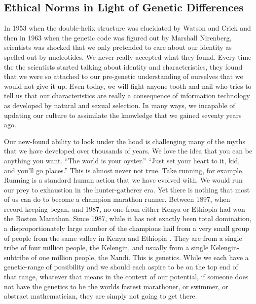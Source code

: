 \subsection{Ethical Norms in Light of Genetic Differences}

In 1953 when the double-helix structure was elucidated by Watson and Crick and then in 1963 when the genetic code was figured out by Marshall Nirenberg, scientists was shocked that we only pretended to care about our identity as spelled out by nucleotides.
We never really accepted what they found.
Every time the the scientists started talking about identity and characteristics, they found that we were so attached to our pre-genetic understanding of ourselves that we would not give it up.
Even today, we will fight anyone tooth and nail who tries to tell us that our characteristics are really a consequence of information technology as developed by natural and sexual selection.
In many ways, we incapable of updating our culture to assimilate the knowledge that we gained seventy years ago.

Our new-found ability to look under the hood is challenging many of the myths that we have developed over thousands of years.
We love the idea that you can be anything you want.
``The world is your oyster.''
``Just set your heart to it, kid, and you'll go places.''
This is almost never not true.
Take running, for example.
Running is a standard human action that we have evolved with.
We would run our prey to exhaustion in the hunter-gatherer era.
Yet there is nothing that most of us can do to become a champion marathon runner.
Between 1897, when record-keeping began, and 1987, no one from either Kenya or Ethiopia had won the Boston Marathon.
Since 1987, while it has not exactly been total domination, a disproportionately large number of the champions hail from a very small group of people from the same valley in Kenya and Ethiopia \cite{marathon2020}.
They are from a single tribe of four million people, the Kelengin, and usually from a single Kelengin-subtribe of one million people, the Nandi.
This is genetics.
While we each have a genetic-range of possibility and we should each aspire to be on the top end of that range, whatever that means in the context of our potential, if someone does not have the genetics to be the worlds fastest marathoner, or swimmer, or abstract mathematician, they are simply not going to get there.


